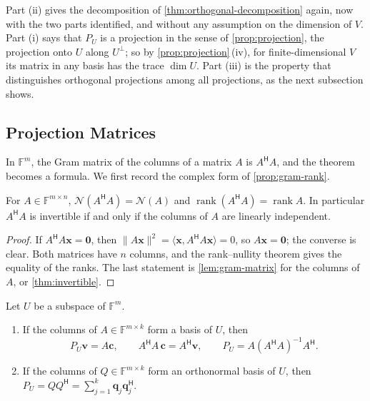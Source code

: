 Part (ii) gives the decomposition of \cref{thm:orthogonal-decomposition} again, now with the two parts identified, and without any assumption on the dimension of $V$. Part (i) says that $P_U$ is a projection in the sense of \cref{prop:projection}, the projection onto $U$ along $U^\perp$; so by \cref{prop:projection}\,(iv), for finite-dimensional $V$ its matrix in any basis has the trace $\dim U$. Part (iii) is the property that distinguishes orthogonal projections among all projections, as the next subsection shows.

\subsection{Projection Matrices}

In $\mathbb F^m$, the Gram matrix of the columns of a matrix $A$ is $A^{\mathsf H}A$, and the theorem becomes a formula. We first record the complex form of \cref{prop:gram-rank}.

\begin{proposition}
\label{prop:gram-rank-complex}
For $A\in\mathbb F^{m\times n}$, $\mathcal N(A^{\mathsf H}A)=\mathcal N(A)$ and $\operatorname{rank}(A^{\mathsf H}A)=\operatorname{rank}A$. In particular $A^{\mathsf H}A$ is invertible if and only if the columns of $A$ are linearly independent.
\end{proposition}

\begin{proof}
If $A^{\mathsf H}A\mathbf x=\mathbf 0$, then $\|A\mathbf x\|^2=\langle\mathbf x,A^{\mathsf H}A\mathbf x\rangle=0$, so $A\mathbf x=\mathbf 0$; the converse is clear. Both matrices have $n$ columns, and the rank--nullity theorem gives the equality of the ranks. The last statement is \cref{lem:gram-matrix} for the columns of $A$, or \cref{thm:invertible}.
\end{proof}

\begin{theorem}
\label{thm:projection-matrix}
Let $U$ be a subspace of $\mathbb F^m$.
\begin{enumerate}
\item If the columns of $A\in\mathbb F^{m\times k}$ form a basis of $U$, then
\[
P_U\mathbf v=A\mathbf c,\qquad A^{\mathsf H}A\,\mathbf c=A^{\mathsf H}\mathbf v,\qquad P_U=A(A^{\mathsf H}A)^{-1}A^{\mathsf H} .
\]
\item If the columns of $Q\in\mathbb F^{m\times k}$ form an orthonormal basis of $U$, then $P_U=QQ^{\mathsf H}=\sum_{j=1}^k\mathbf q_j\mathbf q_j^{\mathsf H}$.
\end{enumerate}
\end{theorem}


